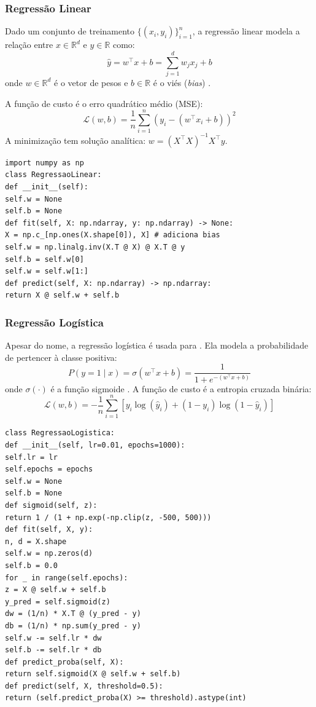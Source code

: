 \subsubsection{Regressão Linear}
\begin{definicao}
Dado um conjunto de treinamento $\{(x_i, y_i)\}_{i=1}^n$, a regressão linear
modela a relação entre $x \in \mathbb{R}^d$ e $y \in \mathbb{R}$ como:
\[\hat{y} = w^\top x + b = \sum_{j=1}^d w_j x_j + b
\]
onde $w \in \mathbb{R}^d$ é o vetor de pesos e $b \in \mathbb{R}$ é o
viés (\textit{bias}) \cite{bishop2006pattern}.
\end{definicao}
A função de custo é o erro quadrático médio (MSE):
\[\mathcal{L}(w, b) = \frac{1}{n} \sum_{i=1}^n (y_i - (w^\top x_i + b))^2
\]
A minimização tem solução analítica: $w = (X^\top X)^{-1} X^\top y$.
\begin{lstlisting}[style=pythonstyle]
import numpy as np
class RegressaoLinear:
def __init__(self):
self.w = None
self.b = None
def fit(self, X: np.ndarray, y: np.ndarray) -> None:
X = np.c_[np.ones(X.shape[0]), X] # adiciona bias
self.w = np.linalg.inv(X.T @ X) @ X.T @ y
self.b = self.w[0]
self.w = self.w[1:]
def predict(self, X: np.ndarray) -> np.ndarray:
return X @ self.w + self.b
\end{lstlisting}
\subsubsection{Regressão Logística}
Apesar do nome, a regressão logística é usada para . Ela modela a probabilidade de pertencer à classe positiva:
\[P(y = 1 \mid x) = \sigma(w^\top x + b) = \frac{1}{1 + e^{-(w^\top x + b)}}
\]
onde $\sigma(\cdot)$ é a função sigmoide \cite{bishop2006pattern}.
A função de custo é a entropia cruzada binária:
\[\mathcal{L}(w, b) = -\frac{1}{n} \sum_{i=1}^n [y_i \log(\hat{y}_i) + (1 - y_i) \log(1 - \hat{y}_i)]
\]
\begin{lstlisting}[style=pythonstyle]
class RegressaoLogistica:
def __init__(self, lr=0.01, epochs=1000):
self.lr = lr
self.epochs = epochs
self.w = None
self.b = None
def sigmoid(self, z):
return 1 / (1 + np.exp(-np.clip(z, -500, 500)))
def fit(self, X, y):
n, d = X.shape
self.w = np.zeros(d)
self.b = 0.0
for _ in range(self.epochs):
z = X @ self.w + self.b
y_pred = self.sigmoid(z)
dw = (1/n) * X.T @ (y_pred - y)
db = (1/n) * np.sum(y_pred - y)
self.w -= self.lr * dw
self.b -= self.lr * db
def predict_proba(self, X):
return self.sigmoid(X @ self.w + self.b)
def predict(self, X, threshold=0.5):
return (self.predict_proba(X) >= threshold).astype(int)
\end{lstlisting}
